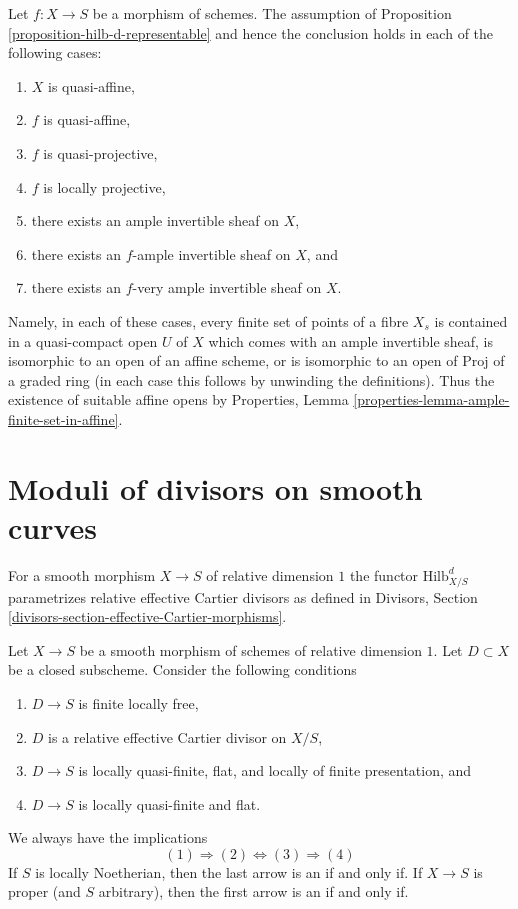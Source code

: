 \begin{remark}
\label{remark-when-proposition-applies}
Let $f : X \to S$ be a morphism of schemes. The assumption of
Proposition \ref{proposition-hilb-d-representable} and
hence the conclusion holds in each of the following cases:
\begin{enumerate}
\item $X$ is quasi-affine,
\item $f$ is quasi-affine,
\item $f$ is quasi-projective,
\item $f$ is locally projective,
\item there exists an ample invertible sheaf on $X$,
\item there exists an $f$-ample invertible sheaf on $X$, and
\item there exists an $f$-very ample invertible sheaf on $X$.
\end{enumerate}
Namely, in each of these cases, every finite set of points of
a fibre $X_s$ is contained in a quasi-compact open $U$ of $X$
which comes with an ample invertible sheaf, is isomorphic
to an open of an affine scheme, or is isomorphic to an open
of $\text{Proj}$ of a graded ring (in each case this follows
by unwinding the definitions). Thus the existence of suitable
affine opens by
Properties, Lemma \ref{properties-lemma-ample-finite-set-in-affine}.
\end{remark}




\section{Moduli of divisors on smooth curves}
\label{section-divisors}

\noindent
For a smooth morphism $X \to S$ of relative dimension $1$ the functor
$\text{Hilb}^d_{X/S}$ parametrizes relative effective Cartier divisors
as defined in
Divisors, Section \ref{divisors-section-effective-Cartier-morphisms}.

\begin{lemma}
\label{lemma-divisors-on-curves}
Let $X \to S$ be a smooth morphism of schemes of relative dimension $1$.
Let $D \subset X$ be a closed subscheme. Consider the following conditions
\begin{enumerate}
\item $D \to S$ is finite locally free,
\item $D$ is a relative effective Cartier divisor on $X/S$,
\item $D \to S$ is locally quasi-finite, flat, and
locally of finite presentation, and
\item $D \to S$ is locally quasi-finite and flat.
\end{enumerate}
We always have the implications
$$
(1) \Rightarrow (2) \Leftrightarrow (3) \Rightarrow (4)
$$
If $S$ is locally Noetherian, then the last arrow is an if and only if.
If $X \to S$ is proper (and $S$ arbitrary), then the first arrow is
an if and only if.
\end{lemma}

